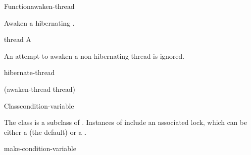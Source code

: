\documentclass[10pt,twoside,english,pdftex]{article}
\begin{document}
\begin{functiondoc}{Function}{awaken-thread}{}
%
%

\fnsyntax

\fnpurpose Awaken a hibernating .

\fnpackage {}

\fnmodule {}

\fnargs
\begin{args}{thread}
\arg[thread] A 
\end{args}

\fnerrors
\nothreads{}

\fndescription An attempt to awaken a non-hibernating thread is ignored.

\begin{alsos}{hibernate-thread}
\end{alsos}

\fnexample
%
\W\supp
\begin{example}
  (awaken-thread thread)
\end{example}

\end{functiondoc}


\begin{functiondoc}{Class}{condition-variable}{}
%
  
\fnsyntax

\fnpackage {}

\fnmodule {}

\fndescription The class  is a subclass of
.  Instances of
 include an associated lock, which can be
either a  (the default) or a .

\begin{alsos}{make-condition-variable}
\end{alsos}

\end{functiondoc}

\end{document}
